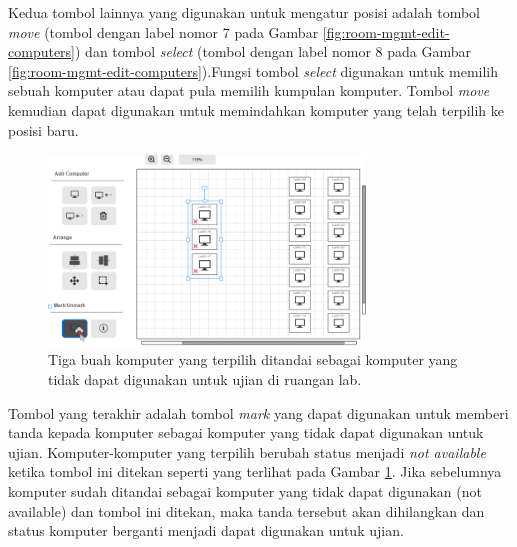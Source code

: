 \documentclass[a4paper,twoside]{article}
\begin{document}
\begin{enumerate}
\begin{itemize}
\begin{itemize}
                Kedua tombol lainnya yang digunakan untuk mengatur posisi adalah tombol  \textit{move} (tombol dengan label nomor 7 pada Gambar \ref{fig:room-mgmt-edit-computers}) dan tombol \textit{select} (tombol dengan label nomor 8 pada Gambar \ref{fig:room-mgmt-edit-computers}).Fungsi tombol \textit{select} digunakan untuk memilih sebuah komputer atau dapat pula memilih kumpulan komputer. Tombol \textit{move} kemudian dapat digunakan untuk memindahkan komputer yang telah terpilih ke posisi baru. 
                
                
                  \begin{figure}[H]
                    \centering
                    \includegraphics[width=0.75\textwidth]{images/ui designs/room-management/mark-unavailable.png}
                    \caption{Tiga buah komputer yang terpilih ditandai sebagai komputer yang tidak dapat digunakan untuk ujian di ruangan lab.}
                    \label{fig:room-mgmt-edit-computers-mark-unavail}
                \end{figure}
                
                Tombol yang terakhir adalah tombol \textit{mark} yang dapat digunakan untuk memberi tanda kepada komputer sebagai komputer yang tidak dapat digunakan untuk ujian. Komputer-komputer yang terpilih berubah status menjadi \textit{not available} ketika tombol ini ditekan seperti yang terlihat pada Gambar \ref{fig:room-mgmt-edit-computers-mark-unavail}. Jika sebelumnya komputer sudah ditandai sebagai komputer yang tidak dapat digunakan (not available) dan tombol ini ditekan, maka tanda tersebut akan dihilangkan dan status komputer berganti menjadi dapat digunakan untuk ujian.
                \\
                

\end{itemize}
\end{itemize}
\end{enumerate}
\end{document}
